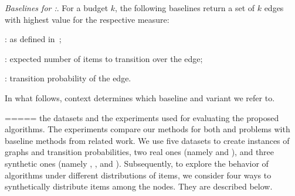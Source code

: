 \emph{Baselines for {\edgeproblem}:}. For a budget $k$, the following baselines
return a set of $k$ edges with highest value for the respective measure:
\squishlist
	\item {\edgebetweenness}: as defined in~\cite{brandes01faster,erdos15divide,riondato16fast};
	\item {\edgenumitems}: expected number of items to transition over the edge;
	\item {\probability}: transition probability of the edge.
\squishend

In what follows, context determines which baseline and variant we refer to.



\iffalse
=====
the datasets and the experiments used for 
evaluating the proposed algorithms. 
The experiments compare our methods for both {\nodeproblem} and 
{\edgeproblem} problems with baseline methods from related work. 
We use five datasets to create instances of graphs and transition
probabilities,
two real ones (namely {\hubway} and {\autonomoussystems}), 
and three synthetic ones (namely {\grid}, {\geo}, and {\ba}). 
Subsequently, to explore the behavior of algorithms under different 
distributions of items, we consider four ways to synthetically
distribute items among the nodes.
They are described below.








